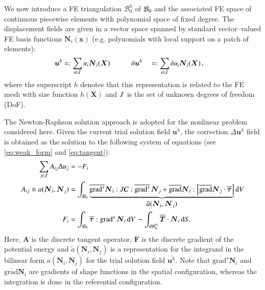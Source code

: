 \documentclass[times,doublespace]{nmeauth}
\def\gz  #1{           \mbox{$\boldsymbol{#1}$}}
\def\grad {\mbox{grad}}
\def\d {\mbox{d}}
\def\mcl  #1{               {\cal #1}}
\begin{document}
We now introduce a FE triangulation $\mathcal{B}^h_0$ of $\mcl B_0$ and
the associated FE space of continuous piecewise elements with polynomial space of fixed degree. %
The displacement fields are given in
a vector space spanned by standard vector--valued FE basis functions $\gz N_i(\gz x)$ (e.g. polynomials with local support on a patch of elements):
\begin{alignat}{2}
       \gz u^h &=:  \sum_{i \in \mcl I} u_i \gz N_i (\gz X) \quad \quad \quad
\delta \gz u^h &&=: \sum_{i \in \mcl I} \delta u_i \gz N_i (\gz X) \,,
\end{alignat}
where the superscript $h$ denotes that this representation is related to the FE mesh with size function $h(\gz X)$ and $\mcl I$ is the set of unknown degrees of freedom (DoF).

The Newton-Raphson solution approach is adopted for the nonlinear problem considered here.
Given the current trial solution field $\overline{\gz u^h}$, the correction $\Delta \gz u^h$ field is obtained as the solution to the following system of equations (see \eqref{eq:weak_form} and \eqref{eq:tangent}):
\begin{align}
  \sum_{j \in \mcl I} A_{ij} \Delta u_j &= - F_i  \label{eq:linear_system} \\
  A_{ij} \equiv a(\gz N_i, \gz N_j) &=
  \int_{\mcl B_0}
  \underbrace{
  \overline{\grad^s} \gz N_i : J \boldsymbol{\mathcal{C}} : \overline{\grad^s} \, \gz N_j
  +
  \overline{\grad}\gz N_i :
  \left[
  \overline{\grad} \gz N_j \cdot
  \overline{\gz \tau}
  \right]
  }_{\displaystyle \tilde{a}(\gz N_i, \gz N_j)}
  \d V
  \label{eq:algebraic_tangent}
  \\
  F_i &=
  \int_{\mcl B_0} \overline{\gz \tau} : \grad^{s} \, \gz N_i \, \d V \,
  -
  \int_{\partial \mcl B_0^N} \overline{\gz T} \cdot \gz N_i \, \d S.
\end{align}
Here, $\gz A$ is the discrete tangent operator, $\gz F$ is the discrete gradient of the potential energy
and $\tilde{a}(\gz N_i, \gz N_j)$ is a representation for the integrand in the bilinear form $a(\gz N_i, \gz N_j)$ for the trial solution field $\overline{\gz u^h}$.
Note that $\overline{\grad^s} \gz N_i$ and $\overline{\grad} \gz N_i$ are gradients of shape functions in the spatial configuration, whereas the integration is done in the referential configuration.
\end{document}
